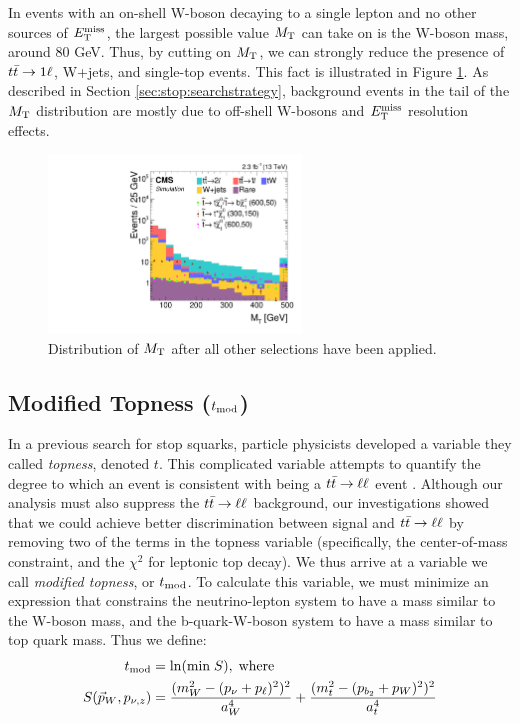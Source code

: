 In events with an on-shell W-boson decaying to a single lepton and no
other sources of $E_\text{T}^\text{miss}$, the largest possible value $M_\text{T}$ can take on
is the W-boson mass, around 80 GeV. Thus, by cutting on $M_\text{T}$, we can
strongly reduce the presence of $t\bar{t} \rightarrow 1\ell$, W+jets, and single-top
events. This fact is illustrated in Figure
\ref{fig:stop:mt:nminusone}. As described in Section
\ref{sec:stop:searchstrategy}, background events in the tail of the
$M_\text{T}$ distribution are mostly due to off-shell W-bosons and $E_\text{T}^\text{miss}$
resolution effects.

\begin{figure}[htb]
\centering
\includegraphics[width=0.6\textwidth]{figures/nminusone_mt.pdf}
\caption{Distribution of $M_\text{T}$ after all other selections have been applied.}
\label{fig:stop:mt:nminusone}
\end{figure}

\subsection{Modified Topness (\texorpdfstring{$t_\text{mod}$}{tmod})}
\label{ssec:stop:tmod}

In a previous search for stop squarks, particle physicists developed a
variable they called \emph{topness}, denoted $t$. This complicated
variable attempts to quantify the degree to which an event is
consistent with being a $t\bar{t} \rightarrow \ell\ell$ event \cite{topness}. Although our
analysis must also suppress the $t\bar{t} \rightarrow \ell\ell$ background, our
investigations showed that we could achieve better discrimination
between signal and $t\bar{t} \rightarrow \ell\ell$ by removing two of the terms in the
topness variable (specifically, the center-of-mass constraint, and the
$\chi^2$ for leptonic top decay). We thus arrive at a variable we call
\emph{modified topness}, or $t_\text{mod}$. To calculate this
variable, we must minimize an expression that constrains the
neutrino-lepton system to have a mass similar to the W-boson mass, and the
b-quark-W-boson system to have a mass similar to top quark mass. Thus
we define:
\begin{equation}
\label{eq:stop:tmod}
\begin{split}
t_\text{mod} & = \ln ( \text{min} \; S ), \; \text{where} \\
S(\vec{p}_W, p_{\nu,z}) & = \frac{(m_W^2-(p_\nu+p_\ell)^2)^2}{a_W^4} + \frac{(m_t^2 - (p_{b_2}+p_W)^2)^2}{a_t^4}
\end{split}
\end{equation}


